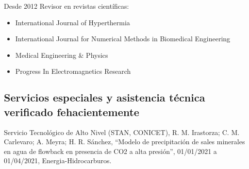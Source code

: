 \documentclass[margin,line]{res}
\begin{document}
\begin{resume}
Desde 2012 Revisor en revistas científicas:\\
\begin{itemize}
 \item International Journal of Hyperthermia
 \item International Journal for Numerical Methods in Biomedical Engineering
 \item Medical Engineering \& Physics
 \item Progress In Electromagnetics Research
\end{itemize}


%
%
%

\subsection{ Servicios especiales y asistencia técnica verificado fehacientemente}

Servicio Tecnológico de Alto Nivel (STAN, CONICET), R. M. Irastorza; C. M. Carlevaro; A. Meyra; H. R. Sánchez, ``Modelo de precipitación de sales minerales en agua de flowback en presencia de CO2 a alta presión'', 01/01/2021 a 01/04/2021, Energia-Hidrocarburos.


\end{resume}
\end{document}
